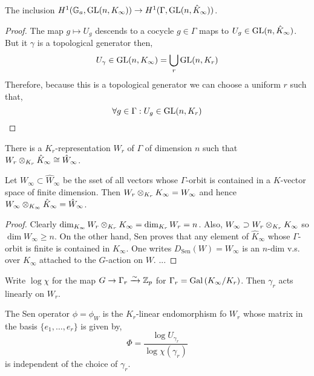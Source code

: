 \documentclass[12pt]{article}
\begin{document}
\begin{prop}[Decompletion]
The inclusion $H^1(\mathbb{G}_a, \mathrm{GL}(n, K_{\infty})) \to H^1(\Gamma, \mathrm{GL}(n, \hat{K}_{\infty}))$.
\end{prop}

\begin{proof}
The map $g \mapsto U_g$ descends to a cocycle $g \in \Gamma$ maps to $U_g \in \mathrm{GL}(n, \hat{K}_{\infty})$. But it $\gamma$ is a topological generator then,
\[ U_\gamma \in \mathrm{GL}(n, K_{\infty}) = \bigcup_r \mathrm{GL}(n, K_r) \]
Therefore, because this is a topological generator we can choose a uniform $r$ such that,
\[ \forall g \in \Gamma : U_g \in \mathrm{GL}(n, K_r) \]
\end{proof}

\begin{prop}
There is a $K_r$-representation $W_r$ of $\Gamma$ of dimension $n$ such that $W_r \otimes_{K_r} \hat{K}_{\infty} \cong \hat{W}_{\infty}$.
\end{prop}

\begin{cor}
Let $W_\infty \subset \hat{W}_{\infty}$ be the sset of all vectors whose $\Gamma$-orbit is contained in a $K$-vector space of finite dimension. Then $W_r \otimes_{K_r} K_\infty = W_\infty$ and hence $W_{\infty} \otimes_{K_\infty} \hat{K}_\infty = \hat{W}_\infty$. 
\end{cor}

\begin{proof}
Clearly $\dim_{K_{\infty}} W_r \otimes_{K_r} K_{\infty} = \dim_{K_r} W_r = n$. Also, $W_{\infty} \supset W_r \otimes_{K_r} K_{\infty}$ so $\dim{W_\infty} \ge n$. On the other hand, Sen proves that any element of $\hat{K}_{\infty}$ whose $\Gamma$-orbit is finite is contained in $K_{\infty}$. One writes $D_{\mathrm{Sen}}(W) = W_\infty$ is an $n$-dim v.s. over $K_{\infty}$ attached to the $G$-action on $W$. ...
\end{proof}

\begin{rmk}
Write $\log{\chi}$ for the map $G \to \Gamma_r \xrightarrow{\sim} \mathbb{Z}_p$ for $\Gamma_r = \mathrm{Gal}\left( K_{\infty} / K_r \right)$. Then $\gamma_r$ acts linearly on $W_r$. 
\end{rmk}

\begin{defn}
The Sen operator $\phi = \phi_W$ is the $K_r$-linear endomorphism fo $W_r$ whose matrix in the basis $\{ e_1, \dots, e_r \}$ is given by,
\[ \Phi = \frac{\log{U_{\gamma_r}}}{\log{\chi(\gamma_r)}} \]
is independent of the choice of $\gamma_r$. 
\end{defn}
\end{document}
